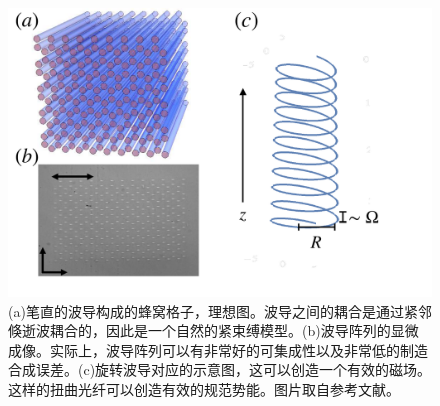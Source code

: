 \documentclass[supercite]{HustGraduPaper}
\begin{document}
\begin{figure}
	\centering
	\includegraphics[width=0.7\linewidth]{Figures/topphoto/mikael-fig1}
	\caption{(a)笔直的波导构成的蜂窝格子，理想图。波导之间的耦合是通过紧邻倏逝波耦合的，因此是一个自然的紧束缚模型。(b)波导阵列的显微成像。实际上，波导阵列可以有非常好的可集成性以及非常低的制造合成误差。(c)旋转波导对应的示意图，这可以创造一个有效的磁场。这样的扭曲光纤可以创造有效的规范势能。图片取自参考文献\cite{rechtsman2013strain,rechtsman2013photonic,rechtsman2013topological}。}
	\label{fig:mikael-fig1}
\end{figure}
\end{document}
